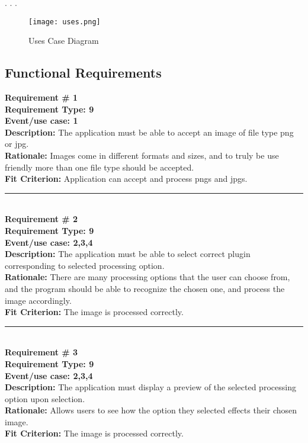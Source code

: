 \documentclass[12pt, titlepage]{article}
\begin{document}
. . .

\begin{figure}[h]
	\texttt{[image: uses.png]}
	\caption{Uses Case Diagram}
	\end{figure}


\subsection{Functional Requirements}

	\textbf{Requirement \# 1}\\
	\textbf{Requirement Type:  9}\\
	\textbf{Event/use case: 1}\\
	\textbf{Description:} The application must be able to accept an image of file type png or jpg.\\
	\textbf{Rationale:} Images come in different formats and sizes, and to truly be use friendly more than one file type should be accepted.\\
	\textbf{Fit Criterion:} Application can accept and process pngs and jpgs.

	\noindent\rule{12cm}{0.4pt} \\ 

	\noindent\textbf{Requirement \# 2}\\
	\textbf{Requirement Type: 9}\\
	\textbf{Event/use case: 2,3,4}\\
	\textbf{Description:} The application must be able to select correct plugin corresponding to selected processing option.\\
	\textbf{Rationale:} There are many processing options that the user can choose from, and the program should be able to recognize the chosen one, and process the image accordingly. \\
	\textbf{Fit Criterion:} The image is processed correctly.

	\noindent\rule{12cm}{0.4pt} \\

	\noindent\textbf{Requirement \# 3}\\
	\textbf{Requirement Type: 9}\\
	\textbf{Event/use case: 2,3,4}\\
	\textbf{Description:} The application must display a preview of the selected processing option upon selection.\\
	\textbf{Rationale:} Allows users to see how the option they selected effects their chosen image.\\
	\textbf{Fit Criterion:} The image is processed correctly.\\
\end{document}
